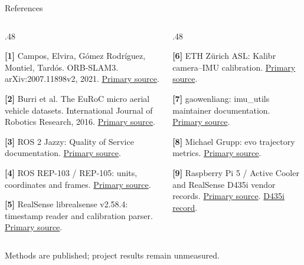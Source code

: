 \documentclass[aspectratio=169,12pt,t]{beamer}
\begin{document}
\begin{frame}{References}\hypertarget{referencepage}{}\footnotesize\begin{columns}[T,onlytextwidth]
\begin{column}{.48\textwidth}
\par\medskip\textbf{[1]} Campos, Elvira, Gómez Rodríguez, Montiel, Tardós. ORB-SLAM3. arXiv:2007.11898v2, 2021. \href{https://arxiv.org/abs/2007.11898}{Primary source}.
\par\medskip\textbf{[2]} Burri et al. The EuRoC micro aerial vehicle datasets. International Journal of Robotics Research, 2016. \href{https://projects.asl.ethz.ch/datasets/euroc-mav/}{Primary source}.
\par\medskip\textbf{[3]} ROS 2 Jazzy: Quality of Service documentation. \href{https://docs.ros.org/en/jazzy/Concepts/Intermediate/About-Quality-of-Service-Settings.html}{Primary source}.
\par\medskip\textbf{[4]} ROS REP-103 / REP-105: units, coordinates and frames. \href{https://www.ros.org/reps/rep-0105.html}{Primary source}.
\par\medskip\textbf{[5]} RealSense librealsense v2.58.4: timestamp reader and calibration parser. \href{https://github.com/realsenseai/librealsense/tree/v2.58.4}{Primary source}.
\end{column}
\begin{column}{.48\textwidth}
\par\medskip\textbf{[6]} ETH Zürich ASL: Kalibr camera–IMU calibration. \href{https://github.com/ethz-asl/kalibr/wiki/camera-imu-calibration}{Primary source}.
\par\medskip\textbf{[7]} gaowenliang: imu\_utils maintainer documentation. \href{https://github.com/gaowenliang/imu_utils}{Primary source}.
\par\medskip\textbf{[8]} Michael Grupp: evo trajectory metrics. \href{https://github.com/MichaelGrupp/evo/wiki/Metrics}{Primary source}.
\par\medskip\textbf{[9]} Raspberry Pi 5 / Active Cooler and RealSense D435i vendor records. \href{https://www.raspberrypi.com/products/raspberry-pi-5/}{Primary source}. \href{https://www.intel.com/content/www/us/en/products/sku/190004/intel-realsense-depth-camera-d435i/specifications.html}{D435i record}.
\end{column}
\end{columns}\vfill\normalsize Methods are published; project results remain unmeasured.\end{frame}
\end{document}
